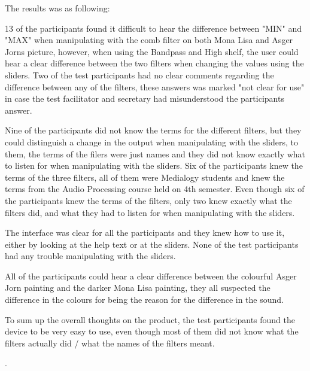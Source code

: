 The results was as following: 

13 of the participants found it difficult to hear the difference between "MIN" and "MAX" when manipulating with the comb filter on both Mona Lisa and Asger Jorns picture, however, when using the Bandpass and High shelf, the user could hear a clear difference between the two filters when changing the values using the sliders. Two of the test participants had no clear comments regarding the difference between any of the filters, these answers was marked "not clear for use" in case the test facilitator and secretary had misunderstood the participants answer. 

Nine of the participants did not know the terms for the different filters, but they could distinguish a change in the output when manipulating with the sliders, to them, the terms of the filers were just names and they did not know exactly what to listen for when manipulating with the sliders. Six of the participants knew the terms of the three filters, all of them were Medialogy students and knew the terms from the Audio Processing course held on 4th semester. Even though six of the  participants knew the terms of the filters, only two knew exactly what the filters did, and what they had to listen for when manipulating with the sliders. 

The interface was clear for all the participants and they knew how to use it, either by looking at the help text or at the sliders. None of the test participants had any trouble manipulating with the sliders. 

All of the participants could hear a clear difference between the colourful Asger Jorn painting and the darker Mona Lisa painting, they all suspected the difference in the colours for being the reason for the difference in the sound. 

To sum up the overall thoughts on the product, the test participants found the device to be very easy to use, even though most of them did not know what the filters actually did / what the names of the filters meant. 

. 